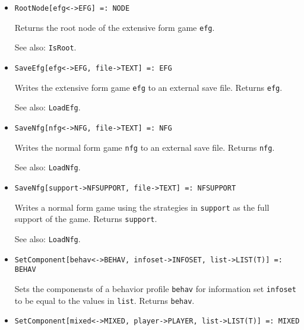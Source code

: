 \begin{itemize}
\item
\protect \large \begin{verbatim}
RootNode[efg<->EFG] =: NODE
\end{verbatim}\normalsize

\bd
Returns the root node of the extensive form game \verb+efg+.
\item
[See also:] {\tt IsRoot}.
\ed


\item
\protect \large \begin{verbatim}
SaveEfg[efg<->EFG, file->TEXT] =: EFG
\end{verbatim}\normalsize

\bd
Writes the extensive form game \verb+efg+ to an external
save file.  Returns \verb+efg+.
\item
[See also:] {\tt LoadEfg}.
\ed

\item
\protect \large \begin{verbatim}
SaveNfg[nfg<->NFG, file->TEXT] =: NFG
\end{verbatim}\normalsize

\bd
Writes the normal form game \verb+nfg+ to an external
save file.  Returns \verb+nfg+.
\item
[See also:] {\tt LoadNfg}.
\ed

\item
\protect \large \begin{verbatim}
SaveNfg[support->NFSUPPORT, file->TEXT] =: NFSUPPORT
\end{verbatim}\normalsize

\bd
Writes a normal form game using the strategies in \verb+support+ as the full support
of the game.  Returns \verb+support+.
\item
[See also:] {\tt LoadNfg}.
\ed

\item
\protect \large \begin{verbatim} 
SetComponent[behav<->BEHAV, infoset->INFOSET, list->LIST(T)] =: BEHAV 
\end{verbatim}\normalsize

\bd
Sets the componensts of a behavior profile \verb+behav+ for
information set \verb+infoset+ to be equal to the values in \verb+list+.
Returns \verb+behav+. 
\ed

\item
\protect \large \begin{verbatim} 
SetComponent[mixed<->MIXED, player->PLAYER, list->LIST(T)] =: MIXED 
\end{verbatim}\normalsize


\end{itemize}
